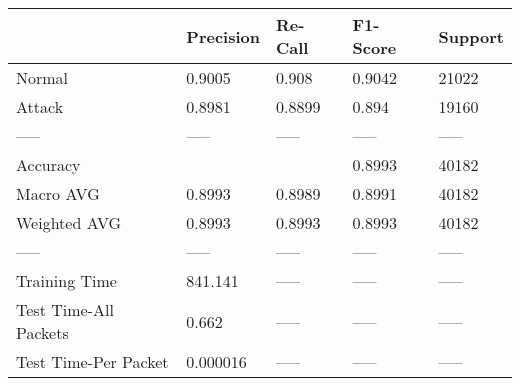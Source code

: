 \begin{tabular}{lllll}
\toprule
{} & Precision & Re-Call & F1-Score & Support \\
\midrule
Normal                &    0.9005 &   0.908 &   0.9042 &   21022 \\
Attack                &    0.8981 &  0.8899 &    0.894 &   19160 \\
-----                 &     ----- &   ----- &    ----- &   ----- \\
Accuracy              &           &         &   0.8993 &   40182 \\
Macro AVG             &    0.8993 &  0.8989 &   0.8991 &   40182 \\
Weighted AVG          &    0.8993 &  0.8993 &   0.8993 &   40182 \\
-----                 &     ----- &   ----- &    ----- &   ----- \\
Training Time         &   841.141 &   ----- &    ----- &   ----- \\
Test Time-All Packets &     0.662 &   ----- &    ----- &   ----- \\
Test Time-Per Packet  &  0.000016 &   ----- &    ----- &   ----- \\
\bottomrule
\end{tabular}
